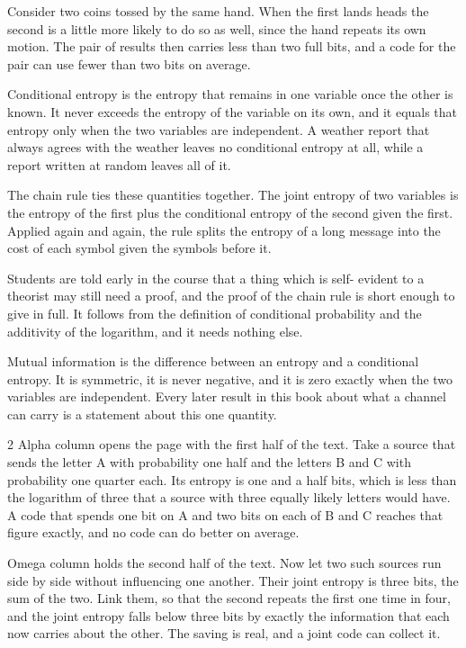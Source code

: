 \documentclass[10pt]{article}
\begin{document}
Consider two coins tossed by the same hand. When the first lands heads the
second is a little more likely to do so as well, since the hand repeats its
own motion. The pair of results then carries less than two full bits, and a
code for the pair can use fewer than two bits on average.

\newpage

Conditional entropy is the entropy that remains in one variable once the
other is known. It never exceeds the entropy of the variable on its own, and
it equals that entropy only when the two variables are independent. A weather
report that always agrees with the weather leaves no conditional entropy at
all, while a report written at random leaves all of it.

The chain rule ties these quantities together. The joint entropy of two
variables is the entropy of the first plus the conditional entropy of the
second given the first. Applied again and again, the rule splits the entropy
of a long message into the cost of each symbol given the symbols before it.

Students are told early in the course that a thing which is self-\linebreak
evident to a theorist may still need a proof, and the proof of the chain rule
is short enough to give in full. It follows from the definition of conditional
probability and the additivity of the logarithm, and it needs nothing else.

Mutual information is the difference between an entropy and a conditional
entropy. It is symmetric, it is never negative, and it is zero exactly when
the two variables are independent. Every later result in this book about
what a channel can carry is a statement about this one quantity.

\newpage

\begin{multicols}{2}
Alpha column opens the page with the first half of the text. Take a source
that sends the letter A with probability one half and the letters B and C
with probability one quarter each. Its entropy is one and a half bits, which
is less than the logarithm of three that a source with three equally likely
letters would have. A code that spends one bit on A and two bits on each of B
and C reaches that figure exactly, and no code can do better on average.
\columnbreak

Omega column holds the second half of the text. Now let two such sources run
side by side without influencing one another. Their joint entropy is three
bits, the sum of the two. Link them, so that the second repeats the first one
time in four, and the joint entropy falls below three bits by exactly the
information that each now carries about the other. The saving is real, and a
joint code can collect it.
\end{multicols}
\end{document}
